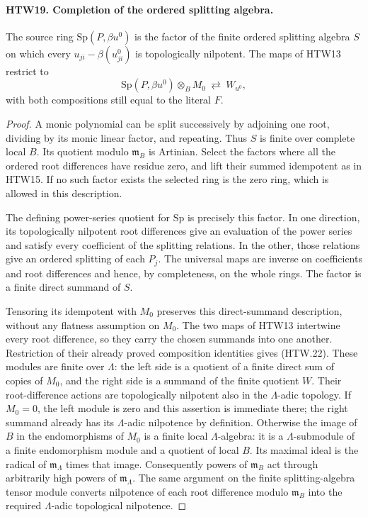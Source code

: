 \documentclass[11pt,a4paper]{article}
\numberwithin{equation}{section}
\theoremstyle{remark}\newtheorem{remark}[theorem]{Remark}
\begin{document}
\paragraph{HTW19. Completion of the ordered splitting algebra.}
\label{claim:HTW19}
The source ring \(\mathrm{Sp}(P,\beta u^0)\) is the
factor of the finite ordered splitting algebra \(S\)
on which every \(u_{ji}-\beta(u^0_{ji})\) is
topologically nilpotent.  The maps of HTW13 restrict
to
\[
 \mathrm{Sp}(P,\beta u^0)\otimes_BM_0
          \ \rightleftarrows\ W_{u^0},
 \tag{HTW.22}
\]
with both compositions still equal to the literal \(F\).
\begin{proof}
A monic polynomial can be split successively by
adjoining one root, dividing by its monic linear
factor, and repeating.  Thus \(S\) is finite over
complete local \(B\).  Its quotient modulo
\(\mathfrak m_B\) is Artinian.  Select the factors
where all the ordered root differences have
residue zero, and lift their summed idempotent as
in HTW15.  If no such factor exists the selected
ring is the zero ring, which is allowed in this
description.

The defining power-series quotient for
\(\mathrm{Sp}\) is precisely this factor.  In one
direction, its topologically nilpotent root
differences give an evaluation of the power series
and satisfy every coefficient of the splitting
relations.  In the other, those relations give an
ordered splitting of each \(P_j\).  The universal
maps are inverse on coefficients and root
differences and hence, by completeness, on the
whole rings.  The factor is a finite direct summand
of \(S\).

Tensoring its idempotent with \(M_0\) preserves this
direct-summand description, without any flatness
assumption on \(M_0\).  The two maps of HTW13
intertwine every root difference, so they carry
the chosen summands into one another.  Restriction
of their already proved composition identities
gives (HTW.22).  These modules are finite over
\(\Lambda\): the left side is a quotient of a
finite direct sum of copies of \(M_0\), and the
right side is a summand of the finite quotient \(W\).
Their root-difference actions are topologically
nilpotent also in the \(\Lambda\)-adic topology.
If \(M_0=0\), the left module is zero and this
assertion is immediate there; the right summand
already has its \(\Lambda\)-adic nilpotence by
definition.  Otherwise the image of \(B\) in the endomorphisms
of \(M_0\) is a finite local \(\Lambda\)-algebra:
it is a \(\Lambda\)-submodule of a finite
endomorphism module and a quotient of local \(B\).
Its maximal ideal is the radical of
\(\mathfrak m_\Lambda\) times that image.
Consequently powers of \(\mathfrak m_B\)
act through arbitrarily high powers of
\(\mathfrak m_\Lambda\).  The same argument
on the finite splitting-algebra tensor module
converts nilpotence of each root difference
modulo \(\mathfrak m_B\) into the required
\(\Lambda\)-adic topological nilpotence.
\end{proof}
\end{document}

